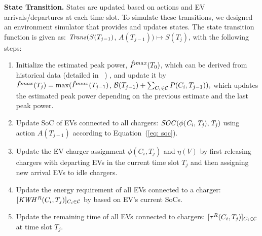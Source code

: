 {\bf State Transition.} 
States are updated based on actions and EV arrivals/departures at each time slot. To simulate these transitions, we designed an environment simulator that provides and updates states. The state transition function is given as:
${\it Trans}(S(T_{j-1})$, $A(T_{j-1})) \mapsto S(T_j)$, with the following steps: 
\begin{enumerate}[leftmargin=*]
    \item Initialize the estimated peak power, $\hat{P}^{max}(T_0)$, which can be derived from historical data 
    (detailed in ~)
    , and update it by
    $
    \hat{P}^{max}(T_{j}) = \max(\hat{P}^{max}(T_{j-1})$, $ \mathcal{B}(T_{j-1}) + \sum_{C_i \in \mathcal{C}} P(C_i, T_{j-1})),
    $
    which updates the estimated peak power depending on the previous estimate and the last peak power.
    \item Update SoC of EVs connected to all chargers: $\it{SOC}(\phi(C_i,T_{j}), T_{j})$ using action $A(T_{j-1})$ according to Equation~(\ref{eq: soc}). 
   \item Update the EV charger assignment $\phi(C_i, T_j)$ and $\eta(V)$ by first releasing chargers with departing EVs in the current time slot $T_j$ and then assigning new arrival EVs to idle chargers. 
   \item Update the energy requirement of all EVs connected to a charger: $[{\it KWH^{R}}(C_i, T_j)]_{C_i \in \mathcal{C}}$ by based on EV's current SoCs.
   \item Update the remaining time of all EVs connected to chargers: $[\tau^R(C_i, T_{j})]_{C_i \in \mathcal{C}}$ at time slot $T_{j}$.   
\end{enumerate}


